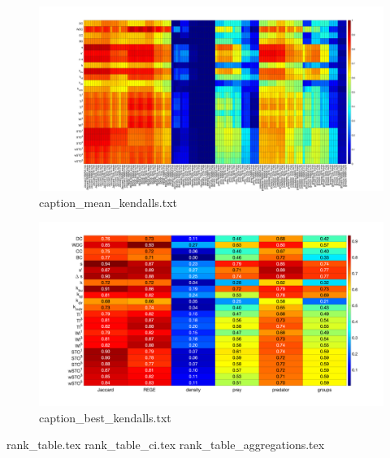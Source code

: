 \documentclass[onecolumn]{article} %
\begin{document}
						\begin{figure}[htbp]%
							\centering
							\includegraphics[width=1.0\linewidth]{mean_kendalls_a.png}
							\caption{ {caption_mean_kendalls.txt} }
							\label{fig:equivalences}
						\end{figure} %

						\begin{figure}[htbp]%
							\centering
							\includegraphics[width=1.0\linewidth]{best_kendalls.png}
							\caption{ {caption_best_kendalls.txt} }
							\label{fig:equivalences}
						\end{figure} %

						{rank_table.tex}
						{rank_table_ci.tex}
						{rank_table_aggregations.tex}
\end{document}
